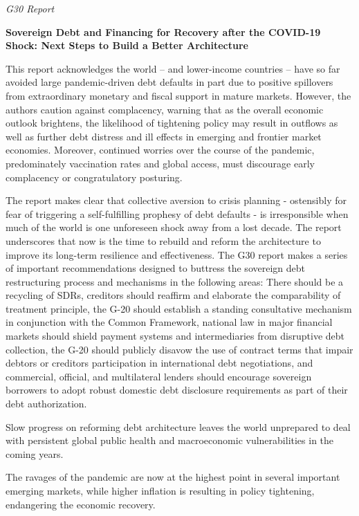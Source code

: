 \documentclass[
]{book}
\begin{document}
\emph{G30 Report}

\textbf{Sovereign Debt and Financing for Recovery after the COVID-19 Shock: Next Steps to Build a Better Architecture}

This report acknowledges the world -- and lower-income countries -- have so far avoided large pandemic-driven debt defaults in part due to positive spillovers from extraordinary monetary and fiscal support in mature markets. However, the authors caution against complacency, warning that as the overall economic outlook brightens, the likelihood of tightening policy may result in outflows as well as further debt distress and ill effects in emerging and frontier market economies. Moreover, continued worries over the course of the pandemic, predominately vaccination rates and global access, must discourage early complacency or congratulatory posturing.

The report makes clear that collective aversion to crisis planning - ostensibly for fear of triggering a self-fulfilling prophesy of debt defaults - is irresponsible when much of the world is one unforeseen shock away from a lost decade. The report underscores that now is the time to rebuild and reform the architecture to improve its long-term resilience and effectiveness. The G30 report makes a series of important recommendations designed to buttress the sovereign debt restructuring process and mechanisms in the following areas: There should be a recycling of SDRs, creditors should reaffirm and elaborate the comparability of treatment principle, the G-20 should establish a standing consultative mechanism in conjunction with the Common Framework, national law in major financial markets should shield payment systems and intermediaries from disruptive debt collection, the G-20 should publicly disavow the use of contract terms that impair debtors or creditors participation in international debt negotiations, and commercial, official, and multilateral lenders should encourage sovereign borrowers to adopt robust domestic debt disclosure requirements as part of their debt authorization.

Slow progress on reforming debt architecture leaves the world unprepared to deal with persistent global public health and macroeconomic vulnerabilities in the coming years.

The ravages of the pandemic are now at the highest point in several important emerging markets, while higher inflation is resulting in policy tightening, endangering the economic recovery.
\end{document}
